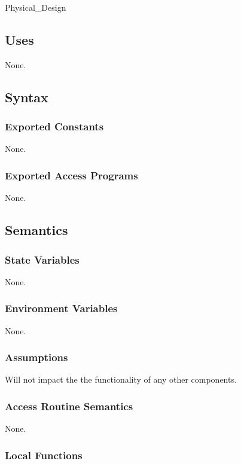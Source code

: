 \documentclass[12pt, titlepage]{article}
\begin{document}
Physical\_Design

\subsection{Uses}
None.

\subsection{Syntax}

\subsubsection{Exported Constants}

None.

\subsubsection{Exported Access Programs}

None.

\subsection{Semantics}

\subsubsection{State Variables}

None.

\subsubsection{Environment Variables}

None.

\subsubsection{Assumptions}

Will not impact the the functionality of any other components.

\subsubsection{Access Routine Semantics}

None.

\subsubsection{Local Functions}
\end{document}

